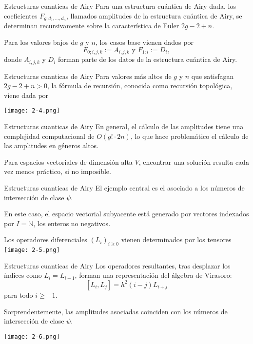 \documentclass{beamer}
\begin{document}
\begin{frame}{Estructuras cuanticas de Airy}
    Para una estructura cuántica de Airy dada, los coeficientes $F_{g;d_{1},...,d_{n}}$, llamados amplitudes de la estructura cuántica de Airy, se determinan recursivamente sobre la característica de Euler $2g - 2 + n$. 
    \newline
    \pause
    
    Para los valores bajos de $g$ y $n$, los casos base vienen dados por 
    $$F_{0;i,j,k} := A_{i,j,k} \text{ y }F_{1;i} := D_{i},$$ donde $A_{i,j,k}$ y  $D_{i}$ forman parte de los datos de la estructura cuántica de Airy. 
\end{frame}

\begin{frame}{Estructuras cuanticas de Airy}
    Para valores más altos de $g$ y $n$ que satisfagan $2g - 2 + n > 0$, la fórmula de recursión, conocida como recursión topológica, viene dada por
    \newline
    \pause

    \texttt{[image: 2-4.png]}
\end{frame}

\begin{frame}{Estructuras cuanticas de Airy}
    En general, el cálculo de las amplitudes tiene una complejidad computacional de $O(g!\cdot 2n)$, lo que hace problemático el cálculo de las amplitudes en géneros altos.
    \newline
    \pause

    Para espacios vectoriales de dimensión alta $V$, encontrar una solución resulta cada vez menos práctico, si no imposible.
\end{frame}

\begin{frame}{Estructuras cuanticas de Airy}
    El ejemplo central es el asociado a los números de intersección de clase $\psi$. 
    \newline
    \pause
    
    En este caso, el espacio vectorial subyacente está generado por vectores indexados por $I = \mathbb{N}$, los enteros no negativos. 
    \newline
    \pause
    
    Los operadores diferenciales $(L_{i})_{i\geq 0}$ vienen determinados por los tensores
    \texttt{[image: 2-5.png]}
\end{frame}

\begin{frame}{Estructuras cuanticas de Airy}
    Los operadores resultantes, tras desplazar los índices como $L_{i} = L_{i-1}$, forman una representación del álgebra de Virasoro: 
    $$[L_i,L_j] = h^{2}(i - j)L_{i+j}$$
    para todo $i \geq -1$. 
    \newline
    \pause
    
    Sorprendentemente, las amplitudes asociadas coinciden con los números de intersección de clase $\psi$. 
    \newline
    \pause
    
    \texttt{[image: 2-6.png]}
\end{frame}
\end{document}
